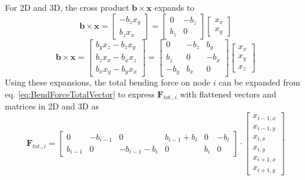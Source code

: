 \documentclass {scrbook}
\begin{document}
For 2D and 3D, the cross product $\bm{b}\times\bm{x}$ expands to
$$\bm{b}\times\bm{x} = \left[ \begin{array}{c} -b_z x_y \\ b_z x_x \end{array} \right]
= \left[ \begin{array}{cc} 0 & -b_z \\ b_z & 0 \end{array} \right] \left[ \begin{array}{c} x_x \\ x_y \end{array} \right]$$
$$\bm{b}\times\bm{x} = \left[ \begin{array}{c} b_y x_z - b_z x_y \\ b_z x_x - b_x x_z \\ b_x x_y - b_y x_x \end{array} \right]
= \left[ \begin{array}{ccc} 0 & -b_z & b_y \\ b_z & 0 & - b_x \\ -b_y & b_x & 0 \end{array} \right] \left[ \begin{array}{c} x_x \\ x_y \\ x_z \end{array} \right]$$
Using these expansions, the total bending force on node $i$ can be expanded from eq. \ref{eq:BendForceTotalVector} to express $\bm{F}_{tot.,i}$ with flattened vectors and matrices in 2D and 3D as
$$\bm{F}_{tot.,i} =
\left[ \begin{array}{cc|cc|cc}
0 & -b_{i-1} & 0 & b_{i-1}+b_i & 0 & -b_i \\
b_{i-1} & 0 & -b_{i-1}-b_i & 0 & b_i & 0
\end{array} \right] \cdot
\left[ \begin{array}{c}
x_{i-1,x} \\ x_{i-1,y} \\ \hline x_{i,x} \\ x_{i,y} \\ \hline x_{i+1,x} \\ x_{i+1,y}
\end{array} \right]
$$
\end{document}
